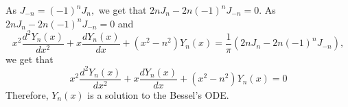 \documentclass{article}
\begin{document}
\begin{flushleft}
As $J_{-n}=(-1)^{n} J_{n},$ we get that $2 n J_{n}-2 n(-1)^{n} J_{-n}=0$. As $2 n J_{n}-2 n(-1)^{n} J_{-n}=0$ and
$$x^{2} \frac{d^{2} Y_{n}(x)}{d x^{2}}+x \frac{d Y_{n}(x)}{d x}+\left(x^{2}-n^{2}\right) Y_{n}(x)=\frac{1}{\pi}\left(2 n J_{n}-2 n(-1)^{n} J_{-n}\right),$$ 
we get that
$$x^{2} \frac{d^{2} Y_{n}(x)}{d x^{2}}+x \frac{d Y_{n}(x)}{d x}+\left(x^{2}-n^{2}\right) Y_{n}(x)=0$$
Therefore, $Y_{n}(x)$ is a solution to the Bessel's ODE.























\end{flushleft}
\end{document}
